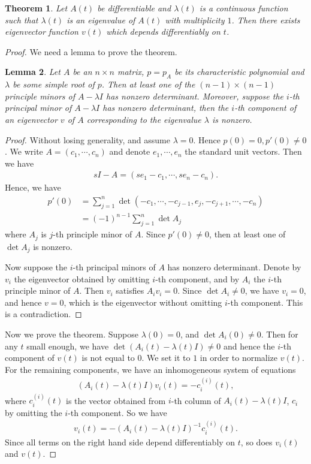 \documentclass[11pt]{book}
\newtheorem{theorem}{Theorem}[section]
\newtheorem{lemma}[theorem]{Lemma}
\theoremstyle{definition}
\numberwithin{equation}{subsection}
\begin{document}
\begin{theorem}
Let $A(t)$ be differentiable and $\lambda(t)$ is a continuous function such that $\lambda(t)$ is an eigenvalue of $A(t)$ with multiplicity $1$. Then there exists eigenvector function $v(t)$ which depends differentiably on $t$. 
\end{theorem}
\begin{proof}
We need a lemma to prove the theorem.
\begin{lemma}
Let $A$ be an $n\times n$ matrix, $p = p_A$ be its characteristic polynomial and $\lambda$ be some simple root of $p$. Then at least one of the $(n-1)\times(n-1)$ principle minors of $A - \lambda I$ has nonzero determinant. Moreover, suppose the $i$-th principal minor of $A - \lambda I$ has nonzero determinant, then the $i$-th component of an eigenvector $v$ of $A$ corresponding to the eigenvalue $\lambda$ is nonzero.
\end{lemma}
\begin{proof}
Without losing generality, and assume $\lambda = 0$. Hence $p(0) = 0, p'(0) \neq 0$. We write $A = (c_1, \cdots, c_n)$ and denote $e_1, \cdots, e_n$ the standard unit vectors. Then we have
\begin{align*}
    s I - A = (se_1 - c_1, \cdots, se_n - c_n).
\end{align*}
Hence, we have
\begin{align*}
    p'(0) & = \sum^n_{j=1} \det (-c_1, \cdots, -c_{j-1}, e_j, -c_{j+1},\cdots, -c_n) \\
    & = (-1)^{n-1} \sum^n_{j=1} \det A_j
\end{align*}
where $A_j$ is $j$-th principle minor of $A$. Since $p'(0) \neq 0$, then at least one of $\det A_j$ is nonzero.

Now suppose the $i$-th principal minors of $A$ has nonzero determinant. Denote by $v_i$ the eigenvector obtained by omitting $i$-th component, and by $A_i$ the $i$-th principle minor of $A$. Then $v_i$ satisfies $A_i v_i = 0$. Since $\det A_i \neq 0$, we have $v_i = 0$, and hence $v = 0$, which is the eigenvector without omitting $i$-th component. This is a contradiction.
\end{proof}

Now we prove the theorem. Suppose $\lambda(0) = 0$, and $\det A_i(0) \neq 0$. Then for any $t$ small enough, we have $\det (A_i(t) - \lambda(t)I) \neq 0$ and hence the $i$-th component of $v(t)$ is not equal to $0$. We set it to $1$ in order to normalize $v(t)$. For the remaining components, we have an inhomogeneous system of equations 
\begin{align*}
    \left(A_i(t) - \lambda(t)I \right) v_i(t) = - c_i^{(i)}(t),
\end{align*}
where $c_i^{(i)}(t)$ is the vector obtained from $i$-th column of $A_i(t) - \lambda(t)I$, $c_i$ by omitting the $i$-th component. So we have 
\begin{align*}
    v_i(t) = - \left(A_i(t) - \lambda(t)I \right)^{-1} c_i^{(i)}(t).
\end{align*}
Since all terms on the right hand side depend differentiably on $t$, so does $v_i(t)$ and $v(t)$. 
\end{proof}
\end{document}
